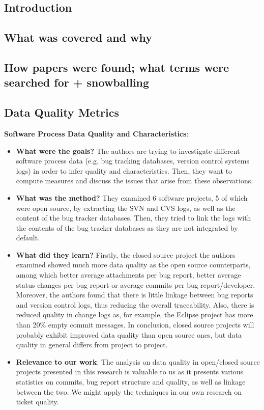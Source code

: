 \documentclass{mprop}
\begin{document}
\subsection{Introduction}

\subsection{What was covered and why}

\subsection{How papers were found; what terms were searched for + snowballing}

\subsection{Data Quality Metrics}

\textbf{Software Process Data Quality and Characteristics}\cite{bachmann2009software}:
\begin{itemize}
  \item \textbf{What were the goals?}
    The authors are trying to investigate different software process data
    (e.g. bug tracking databases, version control systems logs) in order to
    infer quality and characteristics. Then, they want to compute measures
    and discuss the issues that arise from these observations.
  \item \textbf{What was the method?}
    They examined 6 software projects, 5 of which were open source, by extracting
    the SVN and CVS logs, as well as the content of the bug tracker databases. Then,
    they tried to link the logs with the contents of the bug tracker databases as they
    are not integrated by default. 
  \item \textbf{What did they learn?}
    Firstly, the closed source project the authors examined showed much more data
    quality as the open source counterparts, among which better average attachments 
    per bug report, better average status changes per bug report or average commits
    per bug report/developer. Moreover, the authors found that there is little linkage
    between bug reports and version control logs, thus reducing the overall traceability.
    Also, there is reduced quality in change logs as, for example, the Eclipse project
    has more than 20\% empty commit messages. In conclusion, closed source projects will
    probably exhibit improved data quality than open source ones, but data quality in general
    differs from project to project.
  \item \textbf{Relevance to our work}:
    The analysis on data quality in open/closed source projects presented in this 
    research is valuable to us as it presents various statistics on commits, bug report
    structure and quality, as well as linkage between the two. We might apply the techniques
    in our own research on ticket quality.
\end{itemize}
\end{document}
